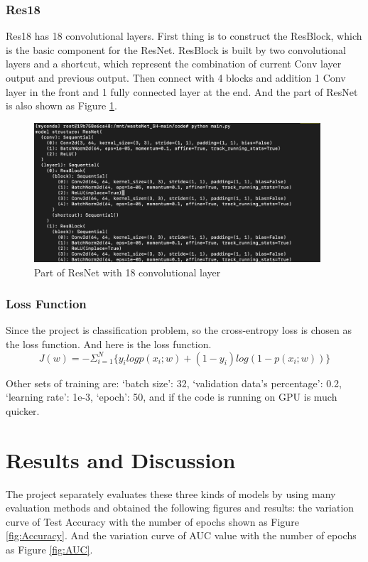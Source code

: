\documentclass{article}
\begin{document}
        \subsubsection*{Res18}
        Res18 has 18 convolutional layers. First thing is to construct the ResBlock, which is the basic component for the ResNet. ResBlock is built by two convolutional layers and a shortcut, which represent the combination of current Conv layer output and previous output. Then connect with 4 blocks and addition 1 Conv layer in the front and 1 fully connected layer at the end. And the part of ResNet is also shown as Figure \ref{fig:res18_model}.
        \begin{figure}[!h]
            \begin{centering}
            \includegraphics[width=0.95\textwidth]{Res18.png}
            \par\end{centering}
            \caption{Part of ResNet with 18 convolutional layer}
            \label{fig:res18_model}
        \end{figure}
        
        \subsubsection*{Loss Function}
        Since the project is classification problem, so the cross-entropy loss is chosen as the loss function. And here is the loss function.
        \begin{equation}
            J(w)=-\Sigma^N_{i=1}\{y_ilogp(x_i;w)+(1-y_i)log(1-p(x_i;w))\}
        \end{equation}
        
        Other sets of training are: `batch size': 32, `validation data's percentage': 0.2, `learning rate': 1e-3, `epoch': 50, and if the code is running on GPU is much quicker.

\section*{Results and Discussion}
The project separately evaluates these three kinds of models by using many evaluation methods and obtained the following figures and results: the variation curve of Test Accuracy with the number of epochs shown as Figure \ref{fig:Accuracy}. And the variation curve of AUC value with the number of epochs as Figure \ref{fig:AUC}.
\end{document}
